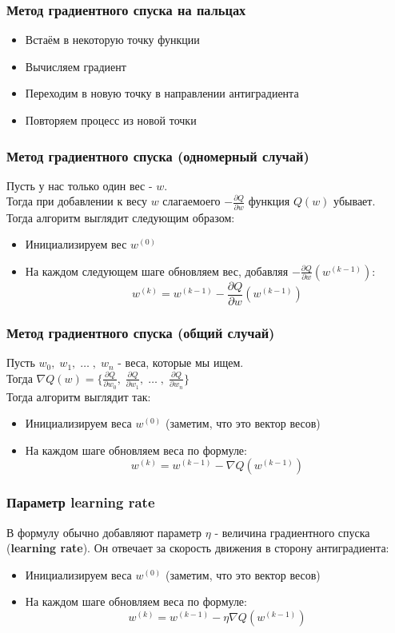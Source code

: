 \documentclass{article}
\theoremstyle{problemstyle}
\theoremstyle{ans}
\begin{document}
\subsubsection{Метод градиентного спуска на пальцах}
\begin{itemize}
    \item Встаём в некоторую точку функции
    \item Вычисляем градиент
    \item Переходим в новую точку в направлении антиградиента
    \item Повторяем  процесс из новой точки
\end{itemize}
\subsubsection{Метод градиентного спуска (одномерный случай)}
Пусть у нас только один вес - $w$.\\
Тогда при добавлении к весу $w$ слагаемоего $-\frac{\partial Q}{\partial w}$ функция $Q(w)$ убывает.\\
Тогда алгоритм выглядит следующим образом:\\
\begin{itemize}
    \item Инициализируем вес $w^{(0)}$
    \item На каждом следующем шаге обновляем вес, добавляя $-\frac{\partial Q}{\partial w}(w^{(k - 1)})$:
    $$w^{(k)} = w^{(k-1)} - \frac{\partial Q}{\partial w}(w^{(k - 1)})$$
\end{itemize}
\subsubsection{Метод градиентного спуска (общий случай)}
Пусть $w_0,\;w_1,\;\dots \; ,\;w_n$ - веса, которые мы ищем.\\
Тогда $\nabla Q(w) = \{\frac{\partial Q}{\partial w_0}, \; \frac{\partial Q}{\partial w_1}, \; \dots\;, \; \frac{\partial Q}{\partial w_n}\}$\\
Тогда алгоритм выглядит так:\\
\begin{itemize}
    \item Инициализируем веса $w^{(0)}$ (заметим, что это вектор весов)
    \item На каждом шаге обновляем веса по формуле:
    $$w^{(k)} = w^{(k-1)} - \nabla Q(w^{(k - 1)})$$
\end{itemize}
\subsubsection{Параметр learning rate}
В формулу обычно добавляют параметр $\eta$ - величина градиентного спуска (\textbf{learning rate}). Он отвечает за скорость движения в сторону антиградиента: \\
\begin{itemize}
    \item Инициализируем веса $w^{(0)}$ (заметим, что это вектор весов)
    \item На каждом шаге обновляем веса по формуле:
    $$w^{(k)} = w^{(k-1)} - \eta \nabla Q(w^{(k - 1)})$$
\end{itemize}
\end{document}
